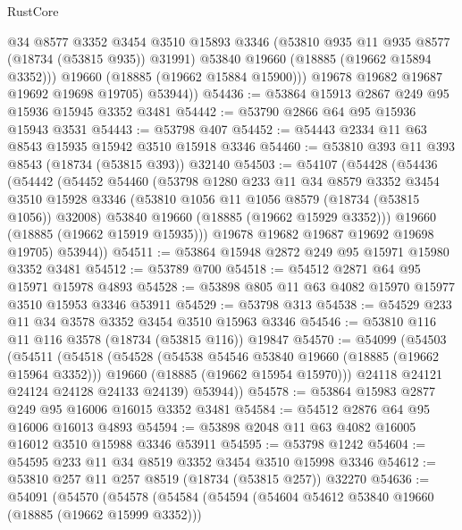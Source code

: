 \begin{lexlean}{RustCore}
\begin{coremodule}
              @34
              @8577
              @3352
              @3454
              @3510
              @15893
              @3346
              (@53810 @935 @11 @935 @8577 (@18734 (@53815 @935)) @31991)
              @53840
              @19660
              (@18885 (@19662 @15894 @3352)))
            @19660
            (@18885 (@19662 @15884 @15900)))
          @19678
          @19682
          @19687
          @19692
          @19698
          @19705)
        @53944))
@54436 := @53864 @15913 @2867 @249 @95 @15936 @15945 @3352 @3481
@54442 := @53790 @2866 @64 @95 @15936 @15943 @3531
@54443 := @53798 @407
@54452 := @54443 @2334 @11 @63 @8543 @15935 @15942 @3510 @15918 @3346
@54460 := @53810 @393 @11 @393 @8543 (@18734 (@53815 @393)) @32140
@54503 := @54107
    (@54428
      (@54436
        (@54442
          (@54452
            @54460
            (@53798
              @1280
              @233
              @11
              @34
              @8579
              @3352
              @3454
              @3510
              @15928
              @3346
              (@53810 @1056 @11 @1056 @8579 (@18734 (@53815 @1056)) @32008)
              @53840
              @19660
              (@18885 (@19662 @15929 @3352)))
            @19660
            (@18885 (@19662 @15919 @15935)))
          @19678
          @19682
          @19687
          @19692
          @19698
          @19705)
        @53944))
@54511 := @53864 @15948 @2872 @249 @95 @15971 @15980 @3352 @3481
@54512 := @53789 @700
@54518 := @54512 @2871 @64 @95 @15971 @15978 @4893
@54528 := @53898 @805 @11 @63 @4082 @15970 @15977 @3510 @15953 @3346 @53911
@54529 := @53798 @313
@54538 := @54529 @233 @11 @34 @3578 @3352 @3454 @3510 @15963 @3346
@54546 := @53810 @116 @11 @116 @3578 (@18734 (@53815 @116)) @19847
@54570 := @54099
    (@54503
      (@54511
        (@54518
          (@54528
            (@54538 @54546 @53840 @19660 (@18885 (@19662 @15964 @3352)))
            @19660
            (@18885 (@19662 @15954 @15970)))
          @24118
          @24121
          @24124
          @24128
          @24133
          @24139)
        @53944))
@54578 := @53864 @15983 @2877 @249 @95 @16006 @16015 @3352 @3481
@54584 := @54512 @2876 @64 @95 @16006 @16013 @4893
@54594 := @53898 @2048 @11 @63 @4082 @16005 @16012 @3510 @15988 @3346 @53911
@54595 := @53798 @1242
@54604 := @54595 @233 @11 @34 @8519 @3352 @3454 @3510 @15998 @3346
@54612 := @53810 @257 @11 @257 @8519 (@18734 (@53815 @257)) @32270
@54636 := @54091
    (@54570
      (@54578
        (@54584
          (@54594
            (@54604 @54612 @53840 @19660 (@18885 (@19662 @15999 @3352)))

\end{coremodule}
\end{lexlean}
